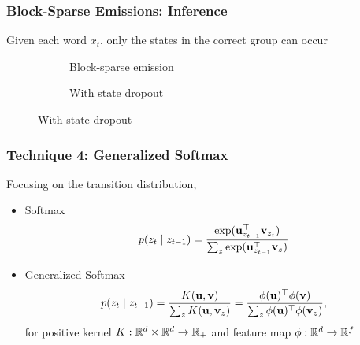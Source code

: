 \documentclass{beamer}
\begin{document}
\begin{comment}
\begin{frame}
\frametitle{Block-Sparse Emissions: Inference}

Given each word $x_t$, only the states in the correct group can occur
\vspace{1em} 

\begin{figure}
\captionsetup[subfigure]{justification=centering}
\begin{center}
\begin{subfigure}[t]{0.45\textwidth}
\centering
\resizebox{0.75\width}{0.75\height}{

}
\caption{No constraints}
\end{subfigure}
\begin{subfigure}[t]{0.45\textwidth}
\centering
\resizebox{0.75\width}{0.75\height}{

}
\caption{Block-sparse emission}
\end{subfigure}
\end{center}
\end{figure}

\end{frame}
\end{comment}

\begin{frame}
\frametitle{Block-Sparse Emissions: Inference}

Given each word $x_t$, only the states in the correct group can occur
\vspace{1em} 

\begin{figure}
\captionsetup[subfigure]{justification=centering}
\begin{center}
\begin{subfigure}[t]{0.45\textwidth}
\centering
\resizebox{0.75\width}{0.75\height}{

}
\caption{Block-sparse emission}
\end{subfigure}
\begin{subfigure}[t]{0.45\textwidth}
\centering
\resizebox{0.75\width}{0.75\height}{

}
\caption{With state dropout}
\end{subfigure}
\end{center}
\end{figure}

\end{frame}

\begin{frame}
\frametitle{Technique 4: Generalized Softmax}
Focusing on the transition distribution,
\vspace{1em}
\begin{itemize}
\item Softmax
$$p(z_t \mid z_{t-1}) = \frac{\exp(\mathbf{u}_{z_{t-1}}^\top \mathbf{v}_{z_{t}})}
{\sum_z \exp(\mathbf{u}_{z_{t-1}}^\top \mathbf{v}_z)}$$
\vspace{1em}
\item Generalized Softmax
$$p(z_t \mid z_{t-1})
= \frac{K(\mathbf{u}, \mathbf{v})}{\sum_z K(\mathbf{u},\mathbf{v}_z)}
= \frac{\phi(\mathbf{u})^\top\phi(\mathbf{v})}
    {\sum_z \phi(\mathbf{u})^\top\phi(\mathbf{v}_z)},$$
for positive kernel $K:\mathbb{R}^d\times\mathbb{R}^d\to\mathbb{R}_+$
and feature map $\phi:\mathbb{R}^d\to\mathbb{R}^f$
\end{itemize}
\end{frame}
\end{document}

